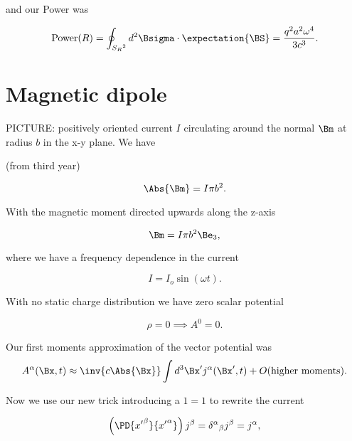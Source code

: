 and our Power was

\begin{equation}\label{eqn:relativisticElectrodynamicsT8:50}
\text{Power}(R) = \oint_{{S_R}^2} d^2 \Bsigma \cdot \expectation{\BS} = \frac{ q^2 a^2 \omega^4 }{3 c^3}.
\end{equation}

\section{Magnetic dipole}

PICTURE: positively oriented current $I$ circulating around the normal $\Bm$ at radius $b$ in the x-y plane.  We have

(from third year)

\begin{equation}\label{eqn:relativisticElectrodynamicsT8:70}
\Abs{\Bm} = I \pi b^2.
\end{equation}

With the magnetic moment directed upwards along the z-axis

\begin{equation}\label{eqn:relativisticElectrodynamicsT8:71}
\Bm = I \pi b^2 \Be_3,
\end{equation}

where we have a frequency dependence in the current

\begin{equation}\label{eqn:relativisticElectrodynamicsT8:72}
I = I_o \sin(\omega t).
\end{equation}

With no static charge distribution we have zero scalar potential

\begin{equation}\label{eqn:relativisticElectrodynamicsT8:90}
\rho = 0 \implies A^0 = 0.
\end{equation}

Our first moments approximation of the vector potential was
\begin{equation}\label{eqn:relativisticElectrodynamicsT8:110}
A^\alpha(\Bx, t) \approx \inv{c \Abs{\Bx}} \int d^3 \Bx' j^\alpha(\Bx', t) + O(\text{higher moments}).
\end{equation}

Now we use our new trick introducing a $1 = 1$ to rewrite the current

\begin{equation}\label{eqn:relativisticElectrodynamicsT8:130}
\left( \PD{{x'}^\beta}{{x'}^\alpha} \right) j^\beta = {\delta^\alpha}_\beta j^\beta = j^\alpha,
\end{equation}

